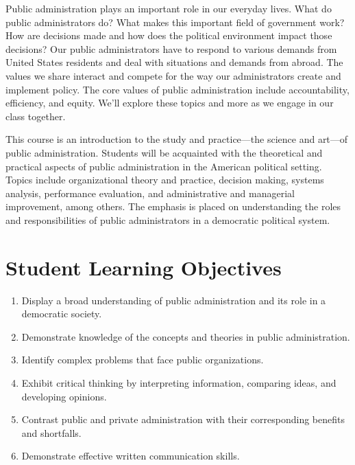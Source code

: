 \documentclass[12pt, letterpaper]{article}
\begin{document}
Public administration plays an important role in our everyday lives. What do public administrators do? What makes this important field of government work? How are decisions made and how does the political environment impact those decisions? Our public administrators have to respond to various demands from United States residents and deal with situations and demands from abroad. The values we share interact and compete for the way our administrators create and implement policy. The core values of public administration include accountability, efficiency, and equity. We'll explore these topics and more as we engage in our class together. 

\vspace*{1em}

\noindent This course is an introduction to the study and practice---the science and art---of public administration. Students will be acquainted with the theoretical and practical aspects of public administration in the American political setting. Topics include organizational theory and practice, decision making, systems analysis, performance evaluation, and administrative and managerial improvement, among others. The emphasis is placed on understanding the roles and responsibilities of public administrators in a democratic political system. 
	

\section*{Student Learning Objectives}

\begin{enumerate}
    \item Display a broad understanding of public administration and its role in a democratic society. 

    \item Demonstrate knowledge of the concepts and theories in public administration. 
    
    \item Identify complex problems that face public organizations.

    \item Exhibit critical thinking by interpreting information, comparing ideas, and developing opinions. 
    
    \item Contrast public and private administration with their corresponding benefits and shortfalls. 

    \item Demonstrate effective written communication skills. 

\end{enumerate}
\end{document}
